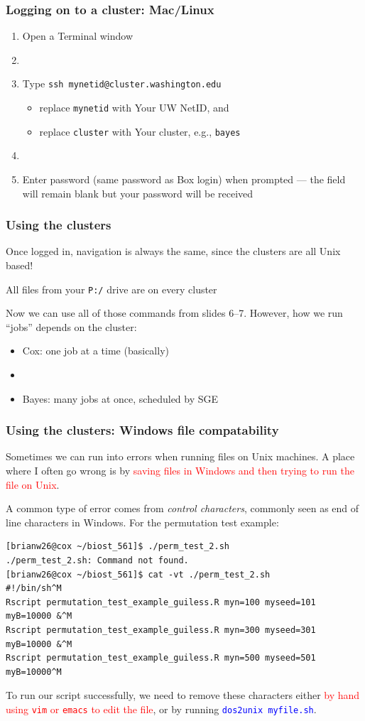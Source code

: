 \documentclass[12pt, 
hyperref={colorlinks=true, linkcolor=blue, urlcolor=cyan}]{beamer}
\newcommand{\myframe}[1]{\begin{frame} \frametitle{#1}}
\begin{document}
\myframe{Logging on to a cluster: Mac/Linux}
\begin{enumerate}
\item Open a Terminal window
\item[]
\item Type \texttt{ssh mynetid@cluster.washington.edu}
\begin{itemize}
\item replace \texttt{mynetid} with Your UW NetID, and 
\item replace \texttt{cluster} with Your cluster, e.g., \texttt{bayes}
\end{itemize} 
\item[]
\item Enter password (same password as Box login) when prompted --- the field will remain blank but your password will be received
\end{enumerate}
\end{frame}

\myframe{Using the clusters}
Once logged in, navigation is always the same, since the clusters are all Unix based!

All files from your \texttt{P:/} drive are on every cluster

Now we can use all of those commands from slides 6--7. However, how we run ``jobs'' depends on the cluster:
\begin{itemize}
\item Cox: one job at a time (basically)
\item[]
\item Bayes: many jobs at once, scheduled by SGE
\end{itemize}
\end{frame}

\begin{frame}[fragile]
\frametitle{Using the clusters: Windows file compatability}
Sometimes we can run into errors when running files on Unix machines. A place where I often go wrong is by \textcolor{red}{saving files in Windows and then trying to run the file on Unix}.

A common type of error comes from \emph{control characters}, commonly seen as end of line characters in Windows. For the permutation test example:
{\scriptsize
\begin{verbatim}
[brianw26@cox ~/biost_561]$ ./perm_test_2.sh
./perm_test_2.sh: Command not found.
[brianw26@cox ~/biost_561]$ cat -vt ./perm_test_2.sh
#!/bin/sh^M
Rscript permutation_test_example_guiless.R myn=100 myseed=101 myB=10000 &^M
Rscript permutation_test_example_guiless.R myn=300 myseed=301 myB=10000 &^M
Rscript permutation_test_example_guiless.R myn=500 myseed=501 myB=10000^M
\end{verbatim}
} 
To run our script successfully, we need to remove these characters either \textcolor{red}{by hand using \texttt{vim} or \texttt{emacs} to edit the file}, or by running \textcolor{blue}{\texttt{dos2unix myfile.sh}}.
\end{frame}
\end{document}
